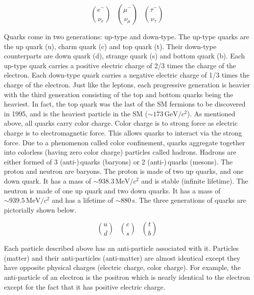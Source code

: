 \begin{equation*}                                                                                                                          
 \binom{e^{-}}{\nu_{e}} \;\;\; \binom{\mu^{-}}{\nu_{\mu}} \;\;\; \binom{\tau^{-}}{\nu_{\tau}}                                           
 \end{equation*}

Quarks come in two generations: up-type and down-type. The up-type quarks are the up quark (u), charm quark (c) and top quark (t). Their down-type counterparts are down quark (d), strange quark (s) and bottom quark (b). Each up-type quark carries a positive electric charge of 2/3 times the charge of the electron. Each down-type quark carries a negative electric charge of 1/3 times the charge of the electron. Just like the leptons, each progressive generation is heavier with the third generation consisting of the top and bottom quarks being the heaviest. In fact, the top quark was the last of the SM fermions to be discovered in 1995, and is the heaviest particle in the SM ($\sim 173\,\mathrm{GeV}/c^2$). As mentioned above, all quarks carry color charge. Color charge is to strong force as electric charge is to electromagnetic force. This allows quarks to interact via the strong force. Due to a phenomenon called color confinement, quarks aggregate together into colorless (having zero color charge) particles called hadrons. Hadrons are either formed of 3 (anti-)\,quarks (baryons) or 2 (anti-)\,quarks (mesons). The proton and neutron are baryons. The proton is made of two up quarks, and one down quark. It has a mass of $\sim 938.3\,\mathrm{MeV}/c^2$ and is stable (infinite lifetime). The neutron is made of one up quark and two down quarks. It has a mass of $\sim 939.5\,\mathrm{MeV}/c^2$ and has a lifetime of $\sim880\,$s. The three generations of quarks are pictorially shown below.

\begin{equation*}
  \binom{u}{d} \;\;\; \binom{c}{s} \;\;\; \binom{t}{b}
\end{equation*}

Each particle described above has an anti-particle associated with it. Particles (matter) and their anti-particles (anti-matter) are almost identical except they have opposite physical charges (electric charge, color charge). For example, the anti-particle of an electron is the positron which is nearly identical to the electron except for the fact that it has positive electric charge.

